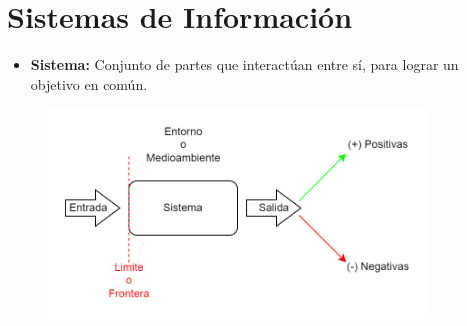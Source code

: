 \documentclass{templateNote}
\begin{document}

\portada
\margenes
\tableofcontents
\newpage

\section{Sistemas de Información}
\begin{itemize}
    \item \textbf{Sistema:} Conjunto de partes que interactúan entre sí, para lograr un objetivo en común.
\end{itemize}
\begin{figure}[H]
    \centering
    \includegraphics[width=0.9\textwidth]{img/diagrama Sistema.png}
\end{figure}
\end{document}

